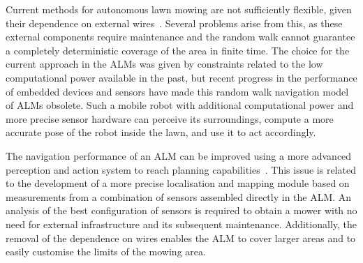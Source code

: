 \noindent
Current methods for autonomous lawn mowing are not sufficiently flexible, given their dependence on external wires~\cite{karol_ardic_conditional_2016}.
Several problems arise from this, as these external components require maintenance and the random walk cannot guarantee a completely deterministic coverage of the area in finite time.
The choice for the current approach in the \glspl{ALM} was given by constraints related to the low computational power available in the past, but recent progress in the performance of embedded devices and sensors have made this random walk navigation model of \glspl{ALM} obsolete.
Such a mobile robot with additional computational power and more precise sensor hardware can perceive its surroundings, compute a more accurate pose of the robot inside the lawn, and use it to act accordingly.



The navigation performance of an \gls{ALM} can be improved using a more advanced perception and action system to reach planning capabilities~\cite{autonomous-yasuda}.
This issue is related to the development of a more precise localisation and mapping module based on measurements from a combination of sensors assembled directly in the \gls{ALM}. %
An analysis of the best configuration of sensors is required to obtain a mower with no need for external infrastructure and its subsequent maintenance.
Additionally, the removal of the dependence on wires enables the \gls{ALM} to cover larger areas and to easily customise the limits of the mowing area.


